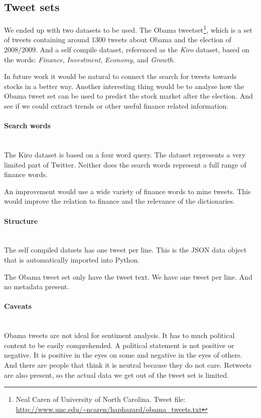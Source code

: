 \subsection{Tweet sets}
We ended up with two datasets to be used. The Obama tweetset\footnote{Neal
Caren of University of North Carolina. Tweet file:
\url{http://www.unc.edu/~ncaren/haphazard/obama_tweets.txt}}, which is a set of
tweets containing around 1300 tweets about Obama and the election of 2008/2009.
And a self compile dataset, referenced as the \textit{Kiro} dataset, based on the words:
\textit{Finance}, \textit{Investment}, \textit{Economy}, and \textit{Growth}. 

In future work it would be natural to connect the search for tweets towards
stocks in a better way. Another interesting thing would be to analyse how the
Obama tweet set can be used to predict the stock market after the election. And
see if we could extract trends or other useful finance related information.  

\paragraph{Search words}
\hspace{0pt}\\
The Kiro dataset is based on a four word query. The dataset represents a very
limited part of Twitter. Neither does the
search words represent a full range of finance words.

An improvement would use a wide variety of finance words to mine tweets. This
would improve the relation to finance and the relevance of the dictionaries. 

\paragraph{Structure}
\hspace{0pt}\\
The self compiled datsets has one tweet per line. This is the JSON data object
that is automatically imported into Python. 

The Obama tweet set only have the tweet text. We have one tweet per line. And
no metadata present. 

\paragraph{Caveats}
\hspace{0pt}\\
Obama tweets are not ideal for sentiment analysis. It has to much political
content to be easily comprehended. A political statement is not positive or
negative. It is positive in the eyes on some and negative in the eyes of others.
And there are people that think it is neutral because they do not care. Retweets
are also present, so the actual data we get out of the tweet set is limited. 

